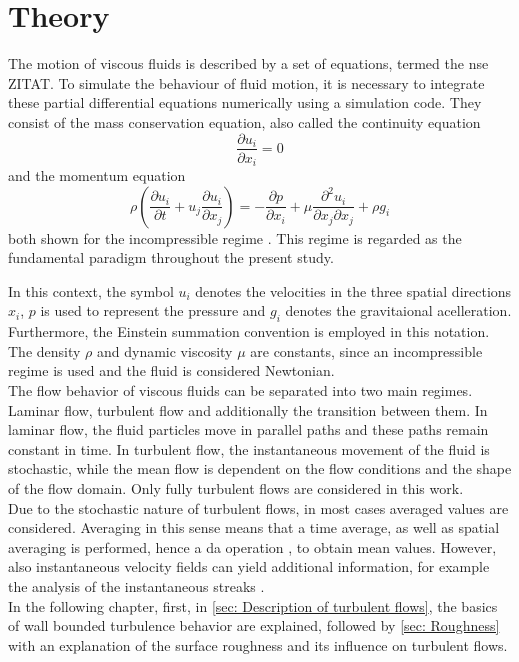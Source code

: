 \chapter{Theory}\label{chap: Theory}
The motion of viscous fluids is described by a set of  equations, termed the \acrfull{nse} ZITAT.
To simulate the behaviour of fluid motion, it is necessary to integrate these partial differential equations  numerically using a simulation code.
They consist of the mass conservation equation, also called the continuity equation
\begin{equation}\label{eq: conservation equation}
    \frac{\partial u_i}{\partial x_i} = 0
\end{equation}
and the momentum equation
\begin{equation}\label{eq: momentum equation}
    \rho \left(\frac{\partial u_i}{\partial t} + u_j \frac{\partial u_i}{\partial x_j}\right) = -\frac{\partial p}{\partial x_i} + \mu\frac{\partial^2 u_i}{\partial x_j \partial x_j} + \rho g_i
\end{equation}
both shown for the incompressible regime \citep{schlichtingBoundaryLayerTheory2017}. This regime is regarded as the fundamental paradigm throughout the present study.

In this context, the symbol  $u_i$ denotes the velocities in the three spatial directions $x_i$, $p$  is used to represent the pressure and $g_i$ denotes
the gravitaional acelleration.
Furthermore,  the Einstein summation convention is employed in this notation.
The density $\rho$ and dynamic viscosity $\mu$ are constants, since an incompressible regime is used and the fluid is considered Newtonian.\\
The flow behavior of viscous fluids can be separated into two main regimes.
Laminar flow, turbulent flow and additionally the transition between them.
In laminar flow, the fluid particles move in parallel paths and these paths remain constant in time. 
In turbulent flow, the instantaneous movement of the fluid is stochastic, while the mean flow is dependent on the flow conditions and the shape of the flow domain.
Only fully turbulent flows are considered in this work.\\
Due to the stochastic nature of turbulent flows, in most cases averaged values are considered.
Averaging in this sense means that a time average, as well as spatial averaging is performed, hence a \acrfull{da} operation \citep{raupachAveragingProceduresFlow1982}, to obtain mean values.
However, also instantaneous velocity fields can yield additional information, for example the analysis of the instantaneous streaks \citep{yaoDirectNumericalSimulations2023}.\\
In the following chapter, first, in \autoref{sec: Description of turbulent flows}, the basics of wall bounded turbulence behavior are explained, followed by \autoref{sec: Roughness} with an explanation of the surface roughness and its influence on turbulent flows.

